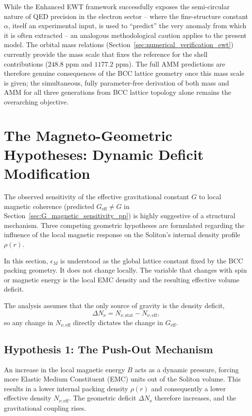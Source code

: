 \documentclass[10pt,a4paper]{article}
\begin{document}
While the Enhanced EWT framework successfully exposes the semi-circular nature 
of QED precision in the electron sector -- where the fine-structure constant 
$\alpha$, itself an experimental input, is used to ``predict'' the very anomaly 
from which it is often extracted -- an analogous methodological caution applies 
to the present model. The orbital mass relations 
(Section~\ref{sec:numerical_verification_ewt}) currently provide the mass scale 
that fixes the reference for the shell contributions ($248.8$ ppm and 
$1177.2$ ppm). The full AMM predictions are therefore genuine consequences of 
the BCC lattice geometry once this mass scale is given; the simultaneous, 
fully parameter-free derivation of both mass and AMM for all three generations 
from BCC lattice topology alone remains the overarching objective.

\section{The Magneto-Geometric Hypotheses: Dynamic Deficit Modification}
\label{sec:magneto_geometric_hypotheses}

The observed sensitivity of the effective gravitational constant \(G\) to local magnetic coherence (predicted \(G_{\text{eff}} \neq G\) in Section~\ref{sec:G_magnetic_sensitivity_pp}) is highly suggestive of a structural mechanism. Three competing geometric hypotheses are formulated regarding the influence of the local magnetic response on the Soliton's internal density profile \(\rho(r)\).

In this section, \(\epsilon_M\) is understood as the global lattice constant fixed by the BCC packing geometry. It does not change locally. The variable that changes with spin or magnetic energy is the local EMC density and the resulting effective volume deficit.

The analysis assumes that the only source of gravity is the density deficit,
\[
\Delta N_\nu = N_{\nu,\text{stat}} - N_{\nu,\text{eff}},
\]
so any change in \(N_{\nu,\text{eff}}\) directly dictates the change in \(G_{\text{eff}}\).

\subsection{Hypothesis 1: The Push-Out Mechanism}
\label{sec:hyp_1_pushout}

An increase in the local magnetic energy \(B\) acts as a dynamic pressure, forcing more Elastic Medium Constituent (EMC) units out of the Soliton volume. This results in a lower internal packing density \(\rho(r)\) and consequently a lower effective density \(N_{\nu,\text{eff}}\). The geometric deficit \(\Delta N_\nu\) therefore increases, and the gravitational coupling rises.
\end{document}
